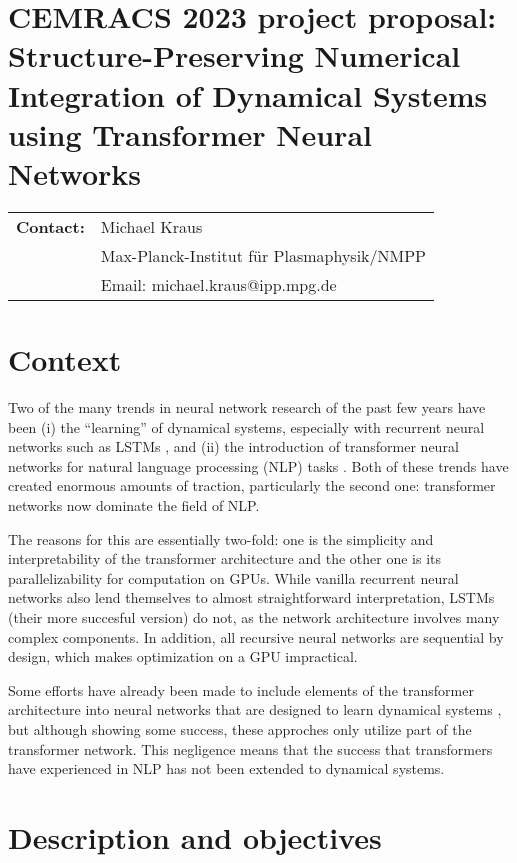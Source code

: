 \documentclass{article}
\begin{document}
{%
\section*{CEMRACS 2023 project proposal: Structure-Preserving Numerical Integration of Dynamical Systems using Transformer Neural Networks}
}

\noindent\begin{tabular}{ll}
\textbf{Contact:} 
 & Michael Kraus \\
& Max-Planck-Institut f\"ur Plasmaphysik/NMPP \\
& Email: michael.kraus@ipp.mpg.de
\end{tabular}

\section{Context}

Two of the many trends in neural network research of the past few years have been (i) the ``learning'' of dynamical systems, especially with recurrent neural networks such as LSTMs \cite{wang2017new, gonzalez2018non, xue2020lstm}, and (ii) the introduction of transformer neural networks for natural language processing (NLP) tasks \cite{vaswani2017attention}. Both of these trends have created enormous amounts of traction, particularly the second one: transformer networks now dominate the field of NLP. 

The reasons for this are essentially two-fold: one is the simplicity and interpretability of the transformer architecture and the other one is its parallelizability for computation on GPUs. While vanilla recurrent neural networks also lend themselves to almost straightforward interpretation, LSTMs (their more succesful version) do not, as the network architecture involves many complex components.
In addition, all recursive neural networks are sequential by design, which makes optimization on a GPU impractical.    

Some efforts have already been made to include elements of the transformer architecture into neural networks that are designed to learn dynamical systems \cite{shalova2020tensorized, geneva2022transformers}, but although showing some success, these approches only utilize part of the transformer network. This negligence means that the success that transformers have experienced in NLP has not been extended to dynamical systems. 

\section{Description and objectives}
\end{document}
